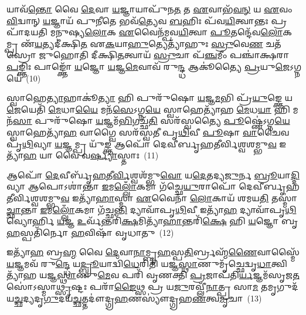 {\anuvakamend[{\-\ul{𑌅}\-\-\ul{𑌤𑍀}\-\-\ul{𑌕𑌾}\-𑌶𑌾𑌨𑍍𑌕᳴\-\ul{𑌰𑍋}\-𑌤𑍍𑌯𑌵𑍇᳴𑌶𑌯\-\ul{𑌨𑍍𑌤𑍀}\-𑌰𑍍𑌥𑍇 𑌸𑍍𑌨𑌾᳴𑌤𑌿 𑌪𑍍𑌰\-\ul{𑌘𑌾}\-𑌤𑍋 𑌮᳴\-\ul{𑌨𑍁}\-𑌷𑍍𑌯𑌾᳴\-\ul{𑌣𑌾}\-𑌨𑍍𑌤𑌦𑍍𑌵𑌾 𑌆𑌙𑍍𑌕𑍍𑌤𑍇᳴ 𑌮𑌿\-\ul{𑌤𑍍𑌰}\-𑌤𑍍𑌵𑌾𑌯᳴ \ul{𑌪}\-𑌞𑍍𑌚\-\ul{𑌭𑌿}\-𑌰𑌪᳴𑌰𑌿𑌵𑌰𑍍𑌗\-\ul{𑌮}\-𑌷𑍍𑌟𑌾𑌚᳴𑌤𑍍𑌵𑌾𑌰𑌿𑍞𑌶𑌚𑍍𑌚}]}%

𑌯𑌾𑌵᳴\-\ul{𑌨𑍍𑌤𑍋} 𑌵𑍈 \ul{𑌦𑍇}\-𑌵𑌾 \ul{𑌯}\-𑌜𑍍𑌞𑌾𑌯𑌾𑌪𑍁᳴𑌨\-\ul{𑌤} 𑌤 \ul{𑌏}\-𑌵𑌾𑌭᳴\-\ul{𑌵}\-\-\ul{𑌨𑍍} 𑌯 \ul{𑌏}\-𑌵𑌂 \ul{𑌵𑌿}\-𑌦𑍍𑌵𑌾𑌨𑍍 \ul{𑌯}\-𑌜𑍍𑌞𑌾𑌯᳴ 𑌪𑍁\-\ul{𑌨𑍀}\-𑌤𑍇 𑌭𑌵᳴\-\ul{𑌤𑍍𑌯𑍇}\-𑌵 \ul{𑌬}\-𑌹𑌿𑌃 𑌪᳴𑌵\-\ul{𑌯𑌿}\-𑌤𑍍𑌵𑌾𑌨𑍍𑌤𑌃 𑌪𑍍𑌰 𑌪𑌾᳴𑌦𑌯𑌤𑌿 𑌮𑌨𑍁𑌷𑍍𑌯\-\ul{𑌲𑍋}\-𑌕 \ul{𑌏}\-𑌵𑍈𑌨᳴𑌮𑍍𑌪𑌵\-\ul{𑌯𑌿}\-𑌤𑍍𑌵𑌾 \ul{𑌪𑍂}\-𑌤𑌨𑍍𑌦𑍇᳴𑌵\-\ul{𑌲𑍋}\-𑌕𑌮𑍍𑌪𑍍𑌰 𑌣᳴\-\ul{𑌯}\-𑌤𑍍𑌯𑌦𑍀॑𑌕𑍍𑌷𑌿\-\ul{𑌤} 𑌏\-\ul{𑌕}\-𑌯𑌾\-\ul{𑌹𑍁}\-𑌤𑍍𑌯𑍇𑌤𑍍𑌯𑌾᳴𑌹𑍁𑌃 \ul{𑌸𑍍𑌰𑍁}\-𑌵𑍇\-\ul{𑌣} 𑌚𑌤᳴𑌸𑍍𑌰𑍋 𑌜𑍁𑌹𑍋𑌤𑌿 𑌦𑍀𑌕𑍍𑌷𑌿\-\ul{𑌤}\-𑌤𑍍𑌵𑌾𑌯᳴ \ul{𑌸𑍍𑌰𑍁}\-𑌚𑌾 𑌪᳴\-\ul{𑌞𑍍𑌚}\-𑌮𑍀𑌂 𑌪𑌞𑍍𑌚𑌾॑𑌕𑍍𑌷𑌰𑌾 \ul{𑌪}\-𑌙𑍍𑌕𑍍𑌤𑌿𑌃 𑌪𑌾𑌙𑍍𑌕𑍍𑌤𑍋᳴ \ul{𑌯}\-𑌜𑍍𑌞𑍋 \ul{𑌯}\-𑌜𑍍𑌞\-\ul{𑌮𑍇}\-𑌵𑌾𑌵᳴ 𑌰𑍁\-\ul{𑌨𑍍𑌦𑍍𑌧} 𑌆𑌕𑍂॑𑌤𑍍𑌯𑍈 \ul{𑌪𑍍𑌰}\-𑌯𑍁\-\ul{𑌜𑍇}\-\-𑌽𑌗𑍍𑌨𑌯𑍇॑~(10)

𑌸𑍍𑌵𑌾𑌹𑍇\-\ul{𑌤𑍍𑌯𑌾}\-𑌹𑌾𑌕𑍂॑\-\ul{𑌤𑍍𑌯𑌾} 𑌹𑌿 𑌪𑍁𑌰𑍁᳴𑌷𑍋 \ul{𑌯}\-𑌜𑍍𑌞\-\ul{𑌮}\-𑌭𑌿 𑌪𑍍𑌰᳴\-\ul{𑌯𑍁}\-𑌙𑍍𑌕𑍍𑌤𑍇 𑌯\-\ul{𑌜𑍇}\-𑌯𑍇𑌤𑌿᳴ \ul{𑌮𑍇}\-𑌧𑌾\-\ul{𑌯𑍈} 𑌮𑌨᳴\-\ul{𑌸𑍇}\-\-𑌽𑌗𑍍𑌨\-\ul{𑌯𑍇} 𑌸𑍍𑌵𑌾𑌹𑍇𑌤𑍍𑌯𑌾᳴𑌹 \ul{𑌮𑍇}\-𑌧\-\ul{𑌯𑌾} 𑌹𑌿 𑌮𑌨᳴\-\ul{𑌸𑌾} 𑌪𑍁𑌰𑍁᳴𑌷𑍋 \ul{𑌯}\-𑌜𑍍𑌞𑌮᳴\-\ul{𑌭𑌿}\-𑌗𑌚𑍍𑌛᳴\-\ul{𑌤𑌿} 𑌸𑌰᳴𑌸𑍍𑌵𑌤𑍍𑌯𑍈 \ul{𑌪𑍂}\-𑌷𑍍𑌣𑍇॑\-𑌽𑌗𑍍𑌨\-\ul{𑌯𑍇} 𑌸𑍍𑌵𑌾𑌹𑍇𑌤𑍍𑌯𑌾᳴\-\ul{𑌹} 𑌵𑌾𑌗𑍍𑌵𑍈 𑌸𑌰᳴𑌸𑍍𑌵𑌤𑍀 𑌪𑍃\-\ul{𑌥𑌿}\-𑌵𑍀 \ul{𑌪𑍂}\-𑌷𑌾 \ul{𑌵𑌾}\-𑌚𑍈𑌵 𑌪𑍃᳴\-\ul{𑌥𑌿}\-𑌵𑍍𑌯𑌾 \ul{𑌯}\-𑌜𑍍𑌞𑌮𑍍𑌪𑍍𑌰 𑌯𑍁᳴\-\ul{𑌙𑍍𑌕𑍍𑌤} 𑌆𑌪𑍋᳴ 𑌦𑍇𑌵𑍀𑌰𑍍𑌬𑍃𑌹𑌤𑍀𑌰𑍍𑌵𑌿𑌶𑍍𑌵𑌶𑌮𑍍𑌭𑍁\-\ul{𑌵} 𑌇𑌤𑍍𑌯𑌾᳴\-\ul{𑌹} 𑌯𑌾 𑌵𑍈 𑌵\-\ul{𑌰𑍍𑌷𑍍𑌯𑌾}\-𑌸𑍍𑌤𑌾𑌃~(11)

𑌆𑌪𑍋᳴ \ul{𑌦𑍇}\-𑌵𑍀𑌰𑍍𑌬𑍃᳴\-\ul{𑌹}\-𑌤𑍀\-\ul{𑌰𑍍𑌵𑌿}\-𑌶𑍍𑌵𑌶᳴𑌮𑍍𑌭𑍁\-\ul{𑌵𑍋} 𑌯\-\ul{𑌦𑍇}\-𑌤𑌦𑍍𑌯\-\ul{𑌜𑍁}\-𑌰𑍍𑌨 \ul{𑌬𑍍𑌰𑍂}\-𑌯𑌾\-\ul{𑌦𑍍𑌦𑌿}\-𑌵𑍍𑌯𑌾 𑌆𑌪𑍋\-𑌽𑌶𑌾॑𑌨𑍍𑌤𑌾 \ul{𑌇}\-𑌮\-\ul{𑌲𑍍𑌲𑍋𑌁}\-𑌕𑌮𑌾 𑌗᳴𑌚𑍍𑌛𑍇\-\ul{𑌯𑍁}\-𑌰𑌾𑌪𑍋᳴ 𑌦𑍇𑌵𑍀𑌰𑍍𑌬𑍃𑌹𑌤𑍀𑌰𑍍𑌵𑌿𑌶𑍍𑌵𑌶𑌮𑍍𑌭𑍁\-\ul{𑌵} 𑌇𑌤𑍍𑌯𑌾᳴\-\ul{𑌹𑌾}\-𑌸𑍍𑌮𑌾 \ul{𑌏}\-𑌵𑍈𑌨𑌾᳴ \ul{𑌲𑍋}\-𑌕𑌾𑌯᳴ 𑌶𑌮𑌯\-\ul{𑌤𑌿} 𑌤𑌸𑍍𑌮𑌾॑\-\ul{𑌚𑍍𑌛𑌾}\-𑌨𑍍𑌤𑌾 \ul{𑌇}\-𑌮\-\ul{𑌲𑍍𑌲𑍋𑌁}\-𑌕𑌮𑌾 𑌗᳴𑌚𑍍𑌛\-\ul{𑌨𑍍𑌤𑌿} 𑌦𑍍𑌯𑌾𑌵𑌾᳴𑌪𑍃\-\ul{𑌥𑌿}\-𑌵𑍀 𑌇𑌤𑍍𑌯𑌾᳴\-\ul{𑌹} 𑌦𑍍𑌯𑌾𑌵𑌾᳴𑌪𑍃\-\ul{𑌥𑌿}\-𑌵𑍍𑌯𑍋𑌰𑍍\mbox{}𑌹𑌿 \ul{𑌯}\-𑌜𑍍𑌞 \ul{𑌉}\-𑌰𑍍𑌵᳴𑌨𑍍𑌤𑌰𑌿᳴\-\ul{𑌕𑍍𑌷}\-𑌮𑌿𑌤𑍍𑌯𑌾᳴\-\ul{𑌹𑌾}\-𑌨𑍍𑌤𑌰𑌿᳴\-\ul{𑌕𑍍𑌷𑍇} 𑌹𑌿 \ul{𑌯}\-𑌜𑍍𑌞𑍋 𑌬𑍃\-\ul{𑌹}\-𑌸𑍍𑌪𑌤𑌿᳴𑌰𑍍𑌨𑍋 \ul{𑌹}\-𑌵𑌿𑌷𑌾᳴ 𑌵𑍃𑌧𑌾𑌤𑍁~(12)

𑌇𑌤𑍍𑌯𑌾᳴\-\ul{𑌹} 𑌬𑍍𑌰\-\ul{𑌹𑍍𑌮} 𑌵𑍈 \ul{𑌦𑍇}\-𑌵𑌾\-\ul{𑌨𑌾}\-𑌮𑍍𑌬𑍃\-\ul{𑌹}\-𑌸𑍍𑌪\-\ul{𑌤𑌿}\-𑌰𑍍𑌬𑍍𑌰𑌹𑍍𑌮᳴\-\ul{𑌣𑍈}\-𑌵𑌾𑌸𑍍𑌮𑍈᳴ \ul{𑌯}\-𑌜𑍍𑌞𑌮𑌵᳴ 𑌰𑍁\-\ul{𑌨𑍍𑌦𑍍𑌧𑍇} 𑌯\-\ul{𑌦𑍍𑌬𑍍𑌰𑍂}\-𑌯𑌾𑌦𑍍𑌵𑌿᳴\-\ul{𑌧𑍇}\-𑌰𑌿𑌤𑌿᳴ 𑌯𑌜𑍍𑌞\-\ul{𑌸𑍍𑌥𑌾}\-𑌣𑍁𑌮𑍃᳴𑌚𑍍𑌛𑍇𑌦𑍍𑌵𑍃\-\ul{𑌧𑌾}\-𑌤𑍍𑌵𑌿𑌤𑍍𑌯𑌾᳴𑌹 𑌯𑌜𑍍𑌞\-\ul{𑌸𑍍𑌥𑌾}\-𑌣𑍁\-\ul{𑌮𑍇}\-𑌵 𑌪𑌰𑌿᳴ 𑌵𑍃𑌣𑌕𑍍𑌤𑌿 \ul{𑌪𑍍𑌰}\-𑌜𑌾𑌪᳴𑌤𑌿\-\ul{𑌰𑍍𑌯}\-𑌜𑍍𑌞𑌮᳴𑌸𑍃𑌜\-\ul{𑌤} 𑌸𑍋॑\-𑌽𑌸𑍍𑌮𑌾\-\ul{𑌥𑍍𑌸𑍃}\-𑌷𑍍𑌟𑌃 𑌪𑌰𑌾᳴\-\ul{𑌙𑍈}\-𑌥𑍍𑌸 𑌪𑍍𑌰 𑌯\-\ul{𑌜𑍁}\-𑌰𑌵𑍍𑌲𑍀᳴\-\ul{𑌨𑌾}\-𑌤𑍍𑌪𑍍𑌰 𑌸𑌾\-\ul{𑌮} 𑌤𑌮𑍃𑌗𑍁𑌦᳴𑌯\-\ul{𑌚𑍍𑌛}\-𑌦𑍍𑌯𑌦𑍃\-\ul{𑌗𑍁}\-𑌦𑌯᳴\-\ul{𑌚𑍍𑌛}\-𑌤𑍍𑌤𑌦𑍗॑𑌦𑍍𑌗𑍍𑌰\-\ul{𑌹}\-𑌣𑌸𑍍𑌯𑍗॑𑌦𑍍𑌗𑍍𑌰𑌹\-\ul{𑌣}\-𑌤𑍍𑌵\-\ul{𑌮𑍃}\-𑌚𑌾~(13)

